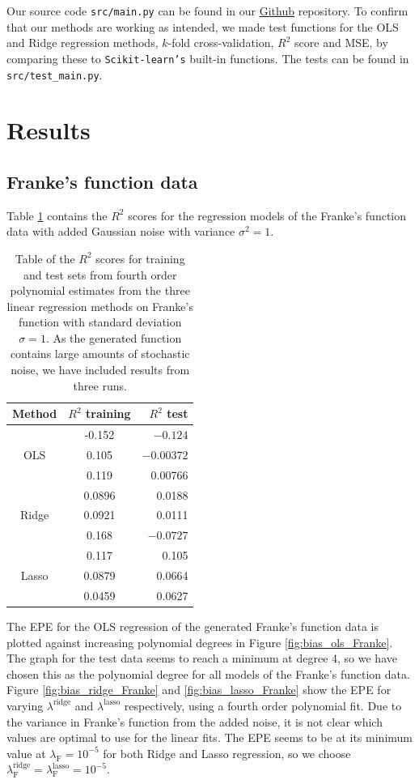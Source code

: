 \documentclass[a4paper, 10pt]{article}
\begin{document}
\begin{multicols}{2}
Our source code \texttt{src/main.py} can be found in our \href{https://github.com/bernharl/FYS-STK4155-project1}{Github} repository. To confirm that our methods are working as intended, we made test functions for the OLS and Ridge regression methods,  $k$-fold cross-validation, $R^2$ score and MSE, by comparing these to \texttt{Scikit-learn's} built-in functions.  The tests can be found in \texttt{src/test\_main.py}. 


\section{Results}
\subsection{Franke's function data}
Table \ref{tab:R2_stddev=1} contains the $R^2$ scores for the regression models of the Franke's function data with added Gaussian noise with variance $\sigma^2 = 1$. 
\begin{table}[H]
\caption{Table of the $R^2$ scores for training and test sets from fourth order polynomial estimates from  the three linear regression methods on Franke's function with standard deviation $\sigma=1$. As the generated function contains large amounts of stochastic noise, we have included results from three runs.\vspace{2pt}}
\label{tab:R2_stddev=1}
\centering
\begin{tabular}{|c|c|r|} \hline
Method & $R^2$ training & $R^2$ test \\ \hline
\multirow{3}{*}{OLS} & -0.152& $-0.124$\\
											& 0.105 & $-0.00372$ \\
											& 0.119   & 0.00766\\ \cline{1-3}
\multirow{3}{*}{Ridge} & 0.0896 & 0.0188\\
											& 0.0921   & 0.0111 \\
											& 0.168      & $-0.0727$\\ \cline{1-3}
\multirow{3}{*}{Lasso} & 0.117& 0.105\\
											& 0.0879   & 0.0664 \\
											& 0.0459 & 0.0627\\ \cline{1-3}
\end{tabular}
\end{table}
The EPE for the OLS regression of the generated Franke's function data is plotted against increasing polynomial degrees in Figure \ref{fig:bias_ols_Franke}.  The graph for the test data seems to reach a minimum at degree 4, so we have chosen this as the polynomial degree for all models of the Franke's function data. Figure \ref{fig:bias_ridge_Franke} and \ref{fig:bias_lasso_Franke} show the EPE for varying $\lambda^\text{ridge}$ and $\lambda^\text{lasso}$ respectively, using a fourth order polynomial fit. Due to the variance in Franke's function from the added  noise, it is not clear which values are optimal to use for the linear fits. The EPE seems to be at its minimum value at $\lambda_\text{F}=10^{-5}$ for both Ridge and Lasso regression, so we choose $\lambda^\text{ridge}_\text{F} = \lambda^\text{lasso}_\text{F}=10^{-5}$.

\end{multicols}
\end{document}

